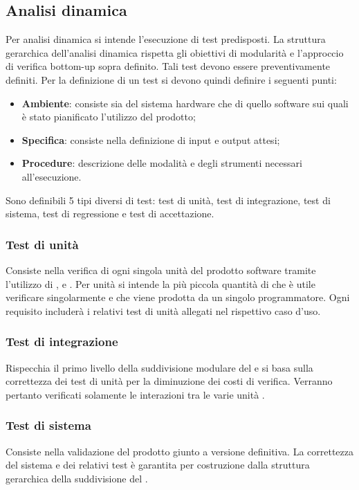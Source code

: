 \documentclass[12pt,a4paper]{article}
\begin{document}
\subsection{Analisi dinamica}
Per analisi dinamica si intende l'esecuzione di test predisposti. La struttura gerarchica dell'analisi dinamica rispetta gli obiettivi di modularità e l'approccio di verifica bottom-up sopra definito. Tali test devono essere preventivamente definiti.
Per la definizione di un test si devono quindi definire i seguenti punti:
\begin{itemize}
	\item \textbf{Ambiente}: consiste sia del sistema hardware che di quello software sui quali è stato pianificato l'utilizzo del prodotto;
	\item \textbf{Specifica}: consiste nella definizione di input e output attesi;
	\item \textbf{Procedure}: descrizione delle modalità e degli strumenti necessari all'esecuzione.
\end{itemize}
Sono definibili 5 tipi diversi di test: test di unità, test di integrazione, test di sistema, test di regressione e test di accettazione.

\subsubsection{Test di unità}
Consiste nella verifica di ogni singola unità del prodotto software tramite l'utilizzo di ,  e .
Per unità si intende la più piccola quantità di  che è utile verificare singolarmente e che viene prodotta da un singolo programmatore.
Ogni requisito includerà i relativi test di unità allegati nel rispettivo caso d'uso.

\subsubsection{Test di integrazione}
Rispecchia il primo livello della suddivisione modulare del  e si basa sulla correttezza dei test di unità per la diminuzione dei costi di verifica. Verranno pertanto verificati solamente le interazioni tra le varie unità .

\subsubsection{Test di sistema}
Consiste nella validazione del prodotto giunto a versione definitiva. La correttezza del sistema e dei relativi test è garantita per costruzione dalla struttura gerarchica della suddivisione del .
\end{document}
